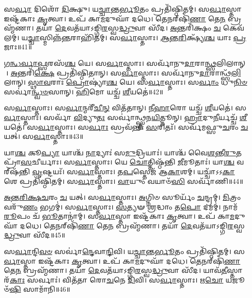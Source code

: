    𑌸\-\ul{𑌰𑍍𑌵𑌾} 𑌦𑌿𑌶𑍋᳴ \ul{𑌦𑌿}\-𑌕𑍍𑌷𑍁।
   𑌯\-\ul{𑌚𑍍𑌚𑌾}\-𑌨𑍍𑌤\-\ul{𑌰𑍍𑌭𑍂}\-𑌤𑌂 𑌪𑍍𑌰𑌤𑌿᳴𑌷𑍍𑌠𑌿𑌤𑌮𑍍।
   𑌸\-\ul{𑌰𑍍𑌵𑌾}\-𑌸𑍍𑌤𑌾 𑌇𑌷𑍍𑌟᳴𑌕𑌾𑌃 \ul{𑌕𑍃}\-𑌤𑍍𑌵𑌾।
   𑌉𑌪᳴ 𑌕𑌾\-\ul{𑌮}\-𑌦𑍁𑌘𑌾᳴ 𑌦𑌧𑍇।
   𑌤𑍇𑌨𑌰𑍍‌𑌷𑌿᳴\-\ul{𑌣𑌾} 𑌤𑍇\-\ul{𑌨} 𑌬𑍍𑌰𑌹𑍍𑌮᳴𑌣𑌾।
   𑌤𑌯𑌾᳴ \ul{𑌦𑍇}\-𑌵𑌤᳴𑌯𑌾𑌽𑌙𑍍𑌗𑌿\-\ul{𑌰}\-𑌸𑍍𑌵\-\ul{𑌦𑍍𑌧𑍍𑌰𑍁}\-𑌵𑌾 𑌸𑍀᳴𑌦।
   \ul{𑌅}\-𑌨𑍍𑌤\-𑌰𑌿᳴𑌕𑍍𑌷𑌂 \ul{𑌚} 𑌕𑍇𑌵᳴𑌲𑌮𑍍।
   𑌯\-\ul{𑌚𑍍𑌚𑌾}\-𑌸𑍍𑌮𑌿𑌨𑍍𑌨᳴\-\ul{𑌨𑍍𑌤}\-𑌰𑌾𑌹𑌿᳴𑌤𑌮𑍍।
   𑌸\-\ul{𑌰𑍍𑌵𑌾}\-𑌸𑍍𑌤𑌾𑌃।
   \ul{𑌆}\-\-\ul{𑌨𑍍𑌤}\-\-\ul{𑌰𑌿}\-𑌕𑍍𑌷𑍍𑌯᳴\-\ul{𑌶𑍍𑌚} 𑌯𑌾𑌃 \ul{𑌪𑍍𑌰}\-𑌜𑌾𑌃॥41॥

   \ul{𑌗}\-\-\ul{𑌨𑍍𑌧}\-\-\ul{𑌰𑍍𑌵𑌾}\-\-\ul{𑌫𑍍𑌸}\-𑌰𑌸᳴\-\ul{𑌶𑍍𑌚} 𑌯𑍇।
   𑌸\-\ul{𑌰𑍍𑌵𑌾}\-𑌸𑍍𑌤𑌾𑌃।
   𑌸𑌰𑍍𑌵𑌾᳴𑌨𑍁\-\ul{𑌦𑌾}\-𑌰𑌾\-\ul{𑌨𑍍𑌥𑍍𑌸}\-𑌲𑌿𑌲𑌾𑌨𑍍।
   \ul{𑌅}\-𑌨𑍍𑌤\-𑌰𑌿᳴\-\ul{𑌕𑍍𑌷𑍇} 𑌪𑍍𑌰𑌤𑌿᳴𑌷𑍍𑌠𑌿𑌤𑌾𑌨𑍍।
   𑌸\-\ul{𑌰𑍍𑌵𑌾}\-𑌸𑍍𑌤𑌾𑌃।
   𑌸𑌰𑍍𑌵𑌾᳴𑌨𑍁\-\ul{𑌦𑌾}\-𑌰𑌾𑌨𑍍𑌥𑍍𑌸᳴\-\ul{𑌲𑌿}\-𑌲𑌾𑌨𑍍।
   \ul{𑌸𑍍𑌥𑌾}\-\-\ul{𑌵}\-𑌰𑌾𑌃 \ul{𑌪𑍍𑌰𑍋}\-𑌷𑍍𑌯𑌾॑\-\ul{𑌶𑍍𑌚} 𑌯𑍇।
   𑌸\-\ul{𑌰𑍍𑌵𑌾}\-𑌸𑍍𑌤𑌾𑌃।
   𑌸\-\ul{𑌰𑍍𑌵𑌾𑌂} 𑌧𑍁\-\ul{𑌨𑌿}\-\-\ul{𑍞} 𑌸𑌰𑍍𑌵𑌾॑\-\ul{𑌨𑍍𑌧𑍍𑌵}\-\-\ul{𑍞}\-𑌸𑌾𑌨𑍍।
   \ul{𑌹𑌿}\-𑌮𑍋 𑌯𑌚𑍍𑌚᳴ \ul{𑌶𑍀}\-𑌯𑌤𑍇॑॥42॥

   𑌸\-\ul{𑌰𑍍𑌵𑌾}\-𑌸𑍍𑌤𑌾𑌃।
   𑌸\-\ul{𑌰𑍍𑌵𑌾}\-𑌨𑍍𑌮𑌰𑍀᳴\-\ul{𑌚𑍀}\-\-\ul{𑌨𑍍} 𑌵𑌿𑌤᳴𑌤𑌾𑌨𑍍।
   \ul{𑌨𑍀}\-\-\ul{𑌹𑌾}\-𑌰𑍋 𑌯𑌚𑍍𑌚᳴ \ul{𑌶𑍀}\-𑌯𑌤𑍇॑।
   𑌸\-\ul{𑌰𑍍𑌵𑌾}\-𑌸𑍍𑌤𑌾𑌃।
   𑌸𑌰𑍍𑌵𑌾᳴ \ul{𑌵𑌿}\-𑌦𑍍𑌯𑍁\-\ul{𑌤𑌃} 𑌸𑌰𑍍𑌵𑌾॑𑌨𑍍𑌥𑍍𑌸𑍍𑌤𑌨\-\ul{𑌯𑌿}\-𑌤𑍍𑌨𑍂𑌨𑍍।
   \ul{𑌹𑍍𑌰𑌾}\-𑌦𑍁\-\ul{𑌨𑍀}\-𑌰𑍍𑌯𑌚𑍍𑌚᳴ \ul{𑌶𑍀}\-𑌯𑌤𑍇॑।
   𑌸\-\ul{𑌰𑍍𑌵𑌾}\-𑌸𑍍𑌤𑌾𑌃।
   𑌸\-\ul{𑌰𑍍𑌵𑌾𑌃} 𑌸𑍍𑌰𑌵᳴𑌨𑍍𑌤𑍀𑌃 \ul{𑌸}\-𑌰𑌿𑌤𑌃᳴।
   𑌸𑌰𑍍𑌵᳴𑌮𑌫𑍍𑌸𑍁\-\ul{𑌚}\-𑌰𑌂 \ul{𑌚} 𑌯𑌤𑍍।
   𑌸\-\ul{𑌰𑍍𑌵𑌾}\-𑌸𑍍𑌤𑌾𑌃॥43॥

   𑌯𑌾\-\ul{𑌶𑍍𑌚} 𑌕𑍂\-\ul{𑌪𑍍𑌯𑌾} 𑌯𑌾𑌶𑍍𑌚᳴ \ul{𑌨𑌾}\-𑌦𑍍𑌯𑌾𑌃॑ 𑌸\-\ul{𑌮𑍁}\-𑌦𑍍𑌰𑌿𑌯𑌾𑌃॑।
   𑌯𑌾𑌶𑍍𑌚᳴ 𑌵𑍈\-\ul{𑌶}\-𑌨𑍍𑌤𑍀\-\ul{𑌰𑍁}\-𑌤 𑌪𑍍𑌰𑌾᳴\-\ul{𑌸}\-𑌚𑍀𑌰𑍍𑌯𑌾𑌃।
   𑌸\-\ul{𑌰𑍍𑌵𑌾}\-𑌸𑍍𑌤𑌾𑌃।
   𑌯𑍇 \ul{𑌚𑍋}\-𑌤𑍍𑌤𑌿𑌷𑍍𑌠᳴𑌨𑍍𑌤𑌿 \ul{𑌜𑍀}\-𑌮𑍂𑌤𑌾𑌃॑।
   𑌯𑌾\-\ul{𑌶𑍍𑌚} 𑌵𑌰𑍍‌𑌷᳴𑌨𑍍𑌤𑌿 \ul{𑌵𑍃}\-𑌷𑍍𑌟𑌯𑌃᳴।
   𑌸\-\ul{𑌰𑍍𑌵𑌾}\-𑌸𑍍𑌤𑌾𑌃।
   𑌤\-\ul{𑌪}\-𑌸𑍍𑌤𑍇𑌜᳴ 𑌆\-\ul{𑌕𑌾}\-𑌶𑌮𑍍।
   𑌯𑌚𑍍𑌚𑌾᳴𑌽𑌽\-\ul{𑌕𑌾}\-𑌶𑍇 𑌪𑍍𑌰𑌤𑌿᳴𑌷𑍍𑌠𑌿𑌤𑌮𑍍।
   𑌸\-\ul{𑌰𑍍𑌵𑌾}\-𑌸𑍍𑌤𑌾𑌃।
   \ul{𑌵𑌾}\-𑌯𑍁𑌂 𑌵𑌯𑌾𑍞᳴\-\ul{𑌸𑌿} 𑌸𑌰𑍍𑌵𑌾᳴𑌣𑌿॥44॥

   \ul{𑌅}\-\-\ul{𑌨𑍍𑌤}\-\-\ul{𑌰𑌿}\-\-\ul{𑌕𑍍𑌷}\-\-\ul{𑌚}\-𑌰𑌂 \ul{𑌚} 𑌯𑌤𑍍।
   𑌸\-\ul{𑌰𑍍𑌵𑌾}\-𑌸𑍍𑌤𑌾𑌃।
   \ul{𑌅}\-𑌗𑍍𑌨𑌿𑍞 𑌸𑍂𑌰𑍍𑌯𑌂᳴ \ul{𑌚}\-𑌨𑍍𑌦𑍍𑌰𑌮𑍍।
   \ul{𑌮𑌿}\-𑌤𑍍𑌰𑌂 𑌵𑌰𑍁᳴\-\ul{𑌣𑌂} 𑌭𑌗𑌮𑍍॑।
   𑌸\-\ul{𑌰𑍍𑌵𑌾}\-𑌸𑍍𑌤𑌾𑌃।
   \ul{𑌸}\-𑌤𑍍𑌯𑍟 \ul{𑌶𑍍𑌰}\-𑌦𑍍𑌧𑌾𑌂 𑌤\-\ul{𑌪𑍋} 𑌦𑌮𑌮𑍍॑।
   𑌨𑌾𑌮᳴ \ul{𑌰𑍂}\-𑌪𑌂 𑌚᳴ \ul{𑌭𑍂}\-𑌤𑌾𑌨𑌾॑𑌮𑍍।
   𑌸\-\ul{𑌰𑍍𑌵𑌾}\-𑌸𑍍𑌤𑌾 𑌇𑌷𑍍𑌟᳴𑌕𑌾𑌃 \ul{𑌕𑍃}\-𑌤𑍍𑌵𑌾।
   𑌉𑌪᳴ 𑌕𑌾\-\ul{𑌮}\-𑌦𑍁𑌘𑌾᳴ 𑌦𑌧𑍇।
   𑌤𑍇𑌨𑌰𑍍‌𑌷𑌿᳴\-\ul{𑌣𑌾} 𑌤𑍇\-\ul{𑌨} 𑌬𑍍𑌰𑌹𑍍𑌮᳴𑌣𑌾।
   𑌤𑌯𑌾᳴ \ul{𑌦𑍇}\-𑌵𑌤᳴𑌯𑌾𑌽𑌙𑍍𑌗𑌿\-\ul{𑌰}\-𑌸𑍍𑌵\-\ul{𑌦𑍍𑌧𑍍𑌰𑍁}\-𑌵𑌾 𑌸𑍀᳴𑌦॥45॥
\anuvakamend
  
   𑌸\-\ul{𑌰𑍍𑌵𑌾}\-𑌨𑍍𑌦𑌿\-\ul{𑌵}\-\-\ul{𑍞} 𑌸𑌰𑍍𑌵𑌾॑\-\ul{𑌨𑍍𑌦𑍇}\-𑌵𑌾\-\ul{𑌨𑍍𑌦𑌿}\-𑌵𑌿।
   𑌯\-\ul{𑌚𑍍𑌚𑌾}\-𑌨𑍍𑌤\-\ul{𑌰𑍍𑌭𑍂}\-𑌤𑌂 𑌪𑍍𑌰𑌤𑌿᳴𑌷𑍍𑌠𑌿𑌤𑌮𑍍।
   𑌸\-\ul{𑌰𑍍𑌵𑌾}\-𑌸𑍍𑌤𑌾 𑌇𑌷𑍍𑌟᳴𑌕𑌾𑌃 \ul{𑌕𑍃}\-𑌤𑍍𑌵𑌾।
   𑌉𑌪᳴ 𑌕𑌾\-\ul{𑌮}\-𑌦𑍁𑌘𑌾᳴ 𑌦𑌧𑍇।
   𑌤𑍇𑌨𑌰𑍍‌𑌷𑌿᳴\-\ul{𑌣𑌾} 𑌤𑍇\-\ul{𑌨} 𑌬𑍍𑌰𑌹𑍍𑌮᳴𑌣𑌾।
   𑌤𑌯𑌾᳴ \ul{𑌦𑍇}\-𑌵𑌤᳴𑌯𑌾𑌽𑌙𑍍𑌗𑌿\-\ul{𑌰}\-𑌸𑍍𑌵\-\ul{𑌦𑍍𑌧𑍍𑌰𑍁}\-𑌵𑌾 𑌸𑍀᳴𑌦।
   𑌯𑌾𑌵᳴\-\ul{𑌤𑍀}\-𑌸𑍍𑌤𑌾𑌰᳴\-\ul{𑌕𑌾𑌃} 𑌸𑌰𑍍𑌵𑌾𑌃॑।
   𑌵𑌿𑌤᳴𑌤𑌾 𑌰𑍋\-\ul{𑌚}\-𑌨𑍇 \ul{𑌦𑌿}\-𑌵𑌿।
   𑌸\-\ul{𑌰𑍍𑌵𑌾}\-𑌸𑍍𑌤𑌾𑌃।
   𑌋\-\ul{𑌚𑍋} 𑌯𑌜𑍂𑍞᳴\-\ul{𑌷𑌿} 𑌸𑌾𑌮𑌾᳴𑌨𑌿॥46॥

